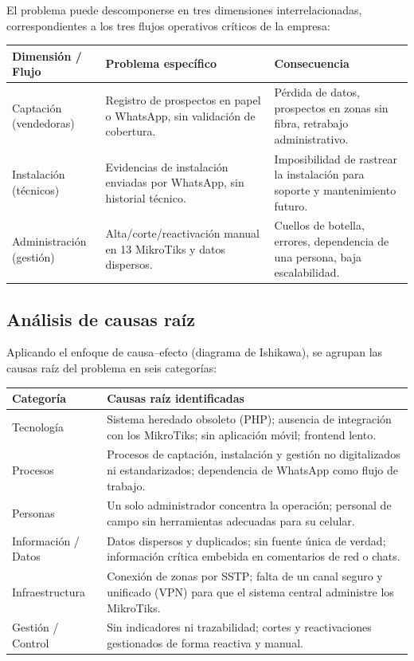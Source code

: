 El problema puede descomponerse en tres dimensiones interrelacionadas,
correspondientes a los tres flujos operativos críticos de la empresa:

\begin{center}
\label{tab:dimensiones}
\begin{tabularx}{\textwidth}{L{2.8cm} X X}
\toprule
\textbf{Dimensión / Flujo} & \textbf{Problema específico} & \textbf{Consecuencia} \\
\midrule
Captación (vendedoras) &
Registro de prospectos en papel o WhatsApp, sin validación de cobertura. &
Pérdida de datos, prospectos en zonas sin fibra, retrabajo administrativo. \\
Instalación (técnicos) &
Evidencias de instalación enviadas por WhatsApp, sin historial técnico. &
Imposibilidad de rastrear la instalación para soporte y mantenimiento futuro. \\
Administración (gestión) &
Alta/corte/reactivación manual en 13 MikroTiks y datos dispersos. &
Cuellos de botella, errores, dependencia de una persona, baja escalabilidad. \\
\bottomrule
\end{tabularx}
\end{center}

\subsection{Análisis de causas raíz}

Aplicando el enfoque de causa--efecto (diagrama de Ishikawa), se agrupan las causas
raíz del problema en seis categorías:

\begin{center}
\label{tab:causas}
\begin{tabularx}{\textwidth}{L{2.6cm} X}
\toprule
\textbf{Categoría} & \textbf{Causas raíz identificadas} \\
\midrule
Tecnología &
Sistema heredado obsoleto (PHP); ausencia de integración con los MikroTiks; sin
aplicación móvil; frontend lento. \\
Procesos &
Procesos de captación, instalación y gestión no digitalizados ni estandarizados;
dependencia de WhatsApp como flujo de trabajo. \\
Personas &
Un solo administrador concentra la operación; personal de campo sin herramientas
adecuadas para su celular. \\
Información / Datos &
Datos dispersos y duplicados; sin fuente única de verdad; información crítica embebida
en comentarios de red o chats. \\
Infraestructura &
Conexión de zonas por SSTP; falta de un canal seguro y unificado (VPN) para que el
sistema central administre los MikroTiks. \\
Gestión / Control &
Sin indicadores ni trazabilidad; cortes y reactivaciones gestionados de forma reactiva
y manual. \\
\bottomrule
\end{tabularx}
\end{center}

